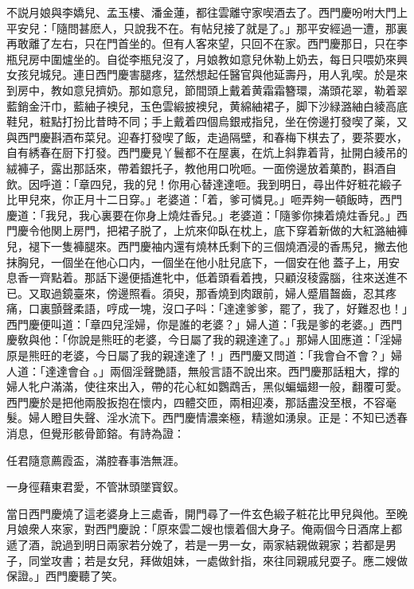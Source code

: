 不説月娘與李嬌兒、孟玉樓、潘金蓮，都往雲離守家喫酒去了。西門慶吩咐大門上平安兒：「隨問甚麽人，只說我不在。有帖兒接了就是了。」那平安經過一遭，那裏再敢離了左右，只在門首坐的。但有人客來望，只回不在家。西門慶那日，只在李瓶兒房中圍爐坐的。自從李瓶兒沒了，月娘教如意兒休勒上奶去，每日只喂奶來興女孩兒城兒。連日西門慶害腿疼，猛然想起任醫官與他延壽丹，用人乳喫。於是來到房中，教如意兒擠奶。那如意兒，節間頭上戴着黄霜霜簪環，滿頭花翠，勒着翠藍銷金汗巾，藍紬子襖兒，玉色雲緞披襖兒，黄綿紬裙子，脚下沙緑潞紬白綾高底鞋兒，粧點打扮比昔時不同；手上戴着四個烏銀戒指兒，坐在傍邊打發喫了薬，又與西門慶斟酒布菜兒。迎春打發喫了飯，走過隔壁，和春梅下棋去了，要茶要水，自有綉春在厨下打發。西門慶見丫鬟都不在屋裏，在炕上斜靠着背，扯開白綾吊的絨褲子，露出那話來，帶着銀托子，教他用口吮咂。一面傍邊放着菓酌，斟酒自飲。因呼道：「章四兒，我的兒！你用心替達達咂。我到明日，尋出件好粧花緞子比甲兒來，你正月十二日穿。」老婆道：「着，爹可憐見。」咂弄夠一頓飯時，西門慶道：「我兒，我心裏要在你身上燒炷香兒。」老婆道：「隨爹你揀着燒炷香兒。」西門慶令他関上房門，把裙子脱了，上炕來仰臥在枕上，底下穿着新做的大紅潞紬褲兒，褪下一隻褲腿來。西門慶袖内還有燒林氏剩下的三個燒酒浸的香馬兒，撇去他抹胸兒，一個坐在他心口内，一個坐在他小肚兒底下，一個安在他𣭈蓋子上，用安息香一齊點着。那話下邊便插進牝中，低着頭看着拽，只顧沒稜露腦，往來送進不已。又取過鏡臺來，傍邊照看。須臾，那香燒到肉跟前，婦人蹙眉齧齒，忍其疼痛，口裏顫聲柔語，哼成一塊，沒口子呌：「達達爹爹，罷了，我了，好難忍也！」西門慶便叫道：「章四兒淫婦，你是誰的老婆？」婦人道：「我是爹的老婆。」西門慶敎與他：「你說是熊旺的老婆，今日屬了我的親達達了。」那婦人囬應道：「淫婦原是熊旺的老婆，今日屬了我的親達達了！」西門慶又問道：「我會㒲不會？」婦人道：「達達會㒲𣭈。」兩個淫聲艷語，無般言語不說出來。西門慶那話粗大，撑的婦人牝户滿滿，使往來出入，帶的花心紅如鸚鵡舌，黑似蝙蝠翅一般，翻覆可愛。西門慶於是把他兩股扳抱在懷内，四體交匝，兩相迎凑，那話盡没至根，不容毫髮。婦人瞪目失聲、淫水流下。西門慶情濃楽極，精邈如湧泉。正是：不知已透春消息，但覺形骸骨節鎔。有詩為證：

\begin{myquote}
任君隨意薦霞盃，滿腔春事浩無涯。

一身徑藉東君愛，不管牀頭墜寳釵。
\end{myquote}

當日西門慶燒了這老婆身上三處香，開門尋了一件玄色緞子粧花比甲兒與他。至晚月娘衆人來家，對西門慶說：「原來雲二嫂也懷着個大身子。俺兩個今日酒席上都遞了酒，說過到明日兩家若分娩了，若是一男一女，兩家結親做親家；若都是男子，同堂攻書；若是女兒，拜做姐妹，一處做針指，來往同親戚兒耍子。應二嫂做保證。」西門慶聽了笑。

